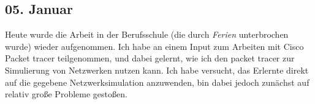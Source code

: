 \subsection{05. Januar}
Heute wurde die Arbeit in der Berufsschule (die durch \textit{Ferien} unterbrochen wurde) wieder aufgenommen. Ich habe an einem Input zum Arbeiten mit Cisco Packet tracer teilgenommen, und dabei gelernt, wie ich den packet tracer zur Simulierung von Netzwerken nutzen kann. Ich habe versucht, das Erlernte direkt auf die gegebene Netzwerksimulation anzuwenden, bin dabei jedoch zunächst auf relativ große Probleme gestoßen.